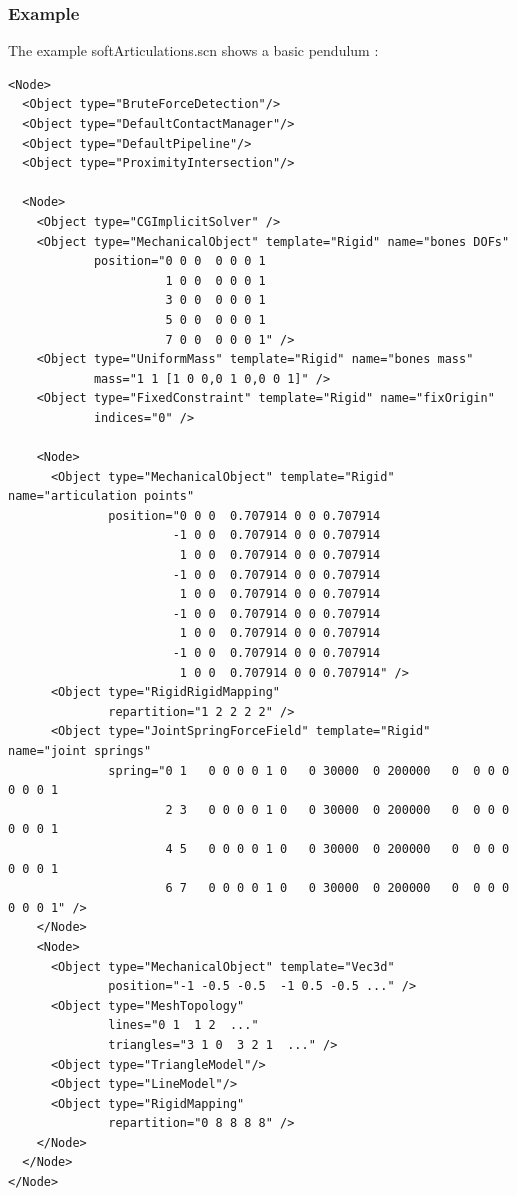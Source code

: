 \subsubsection {Example}

The example softArticulations.scn shows a basic pendulum :

\begin{verbatim}
<Node>
  <Object type="BruteForceDetection"/>
  <Object type="DefaultContactManager"/>
  <Object type="DefaultPipeline"/>
  <Object type="ProximityIntersection"/>

  <Node>
    <Object type="CGImplicitSolver"	/>
    <Object type="MechanicalObject" template="Rigid" name="bones DOFs"
            position="0 0 0  0 0 0 1 
                      1 0 0  0 0 0 1 
                      3 0 0  0 0 0 1 
                      5 0 0  0 0 0 1 
                      7 0 0  0 0 0 1" />
    <Object type="UniformMass" template="Rigid" name="bones mass"
            mass="1 1 [1 0 0,0 1 0,0 0 1]" />
    <Object type="FixedConstraint" template="Rigid" name="fixOrigin"
            indices="0" />
		
    <Node>
      <Object type="MechanicalObject" template="Rigid" name="articulation points"
              position="0 0 0  0.707914 0 0 0.707914 
                       -1 0 0  0.707914 0 0 0.707914 
                        1 0 0  0.707914 0 0 0.707914 
                       -1 0 0  0.707914 0 0 0.707914 
                        1 0 0  0.707914 0 0 0.707914 
                       -1 0 0  0.707914 0 0 0.707914 
                        1 0 0  0.707914 0 0 0.707914 
                       -1 0 0  0.707914 0 0 0.707914 
                        1 0 0  0.707914 0 0 0.707914" />
      <Object type="RigidRigidMapping"
              repartition="1 2 2 2 2" />
      <Object type="JointSpringForceField" template="Rigid" name="joint springs"
              spring="0 1   0 0 0 0 1 0   0 30000  0 200000   0  0 0 0  0 0 0 1 
                      2 3   0 0 0 0 1 0   0 30000  0 200000   0  0 0 0  0 0 0 1
                      4 5   0 0 0 0 1 0   0 30000  0 200000   0  0 0 0  0 0 0 1
                      6 7   0 0 0 0 1 0   0 30000  0 200000   0  0 0 0  0 0 0 1" />
    </Node>
    <Node>
      <Object type="MechanicalObject" template="Vec3d"
              position="-1 -0.5 -0.5  -1 0.5 -0.5 ..." />
      <Object type="MeshTopology"
              lines="0 1  1 2  ..."
              triangles="3 1 0  3 2 1  ..." />
      <Object type="TriangleModel"/>
      <Object type="LineModel"/>
      <Object type="RigidMapping"
              repartition="0 8 8 8 8" />
    </Node>
  </Node>
</Node>

\end{verbatim}

